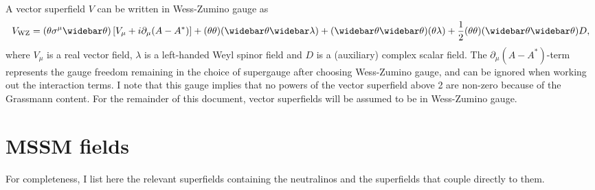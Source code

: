 \documentclass[english, notitlepage]{article}
\begin{document}
    A vector superfield $V$ can be written in Wess-Zumino gauge as
    \begin{align}
        \msub{V}{WZ} = (\theta\sigma^\mu\wbar\theta) \bclosed{V_\mu + i\partial_\mu (A - A^*)} + (\theta\theta) (\wbar\theta\wbar\lambda) +
        (\wbar\theta\wbar\theta)(\theta\lambda) + \frac{1}{2}
        (\theta\theta)(\wbar\theta\wbar\theta) D,
    \end{align}
    where $V_\mu$ is a real vector field, $\lambda$ is a left-handed Weyl spinor field and $D$ is a (auxiliary) complex scalar field.
    The $\partial_\mu (A-A^*)$-term represents the gauge freedom remaining in the choice of
    supergauge after choosing Wess-Zumino gauge, and can be ignored when working
    out the interaction terms.
    I note that this gauge implies that no powers of the vector superfield above 2 are non-zero because of the Grassmann content.
    For the remainder of this document, vector superfields will be assumed to be in Wess-Zumino gauge.

\section{MSSM fields}
    For completeness, I list here the relevant superfields containing the neutralinos and the superfields that couple directly to them.
\end{document}
